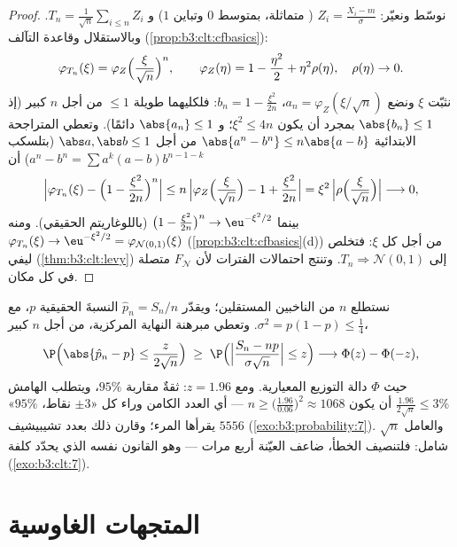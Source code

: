 \begin{proof}
نوسّط ونعيّر: $Z_i = \frac{X_i - m}{\sigma}$ ( متماثلة، بمتوسط $0$ وتباين $1$)
و $T_n =
\frac1{\sqrt n}\sum_{i\leq n}Z_i$. وبالاستقلال وقاعدة التآلف (\cref{prop:b3:clt:cfbasics}):
\[
\varphi_{T_n}(\xi) =
\varphi_{Z}\Bigl(\frac{\xi}{\sqrt n}\Bigr)^{n},
\qquad
\varphi_Z(\eta) = 1 - \frac{\eta^2}2 + \eta^2\rho(\eta),\quad
\rho(\eta)\to0 .
\]
نثبّت $\xi$ ونضع $a_n = \varphi_Z(\xi/\sqrt n)$، $b_n = 1 -
\frac{\xi^2}{2n}$: فلكليهما طويلة $\leq 1$ من
أجل $n$ كبير (إذ $\abs{b_n} \leq 1$ بمجرد أن يكون $\xi^2 \leq 4n$؛ و
$\abs{a_n} \leq 1$ دائمًا). وتعطي المتراجحة الابتدائية $\abs{a^n - b^n} \leq
n\abs{a - b}$ من أجل
$\abs a, \abs b \leq 1$ (بتلسكب $a^n - b^n = \sum a^k(a - b)b^{n-1-k}$) أن
\[
\Bigl|\varphi_{T_n}(\xi) - \Bigl(1 -
\frac{\xi^2}{2n}\Bigr)^{n}\Bigr|
\leq n\,\Bigl|\varphi_Z\Bigl(\frac\xi{\sqrt n}\Bigr) - 1 +
\frac{\xi^2}{2n}\Bigr|
= \xi^2\,\Bigl|\rho\Bigl(\frac{\xi}{\sqrt n}\Bigr)\Bigr|
\longrightarrow 0,
\]
بينما $\bigl(1 - \frac{\xi^2}{2n}\bigr)^n \to
\eu^{-\xi^2/2}$ (باللوغاريتم الحقيقي). ومنه $\varphi_{T_n}(\xi) \to
\eu^{-\xi^2/2} = \varphi_{\mathcal N(0,1)}(\xi)$
(\cref{prop:b3:clt:cfbasics}(d)) من أجل كل $\xi$: فتخلص ليفي (\cref{thm:b3:clt:levy}) إلى
$T_n \Rightarrow \mathcal
N(0,1)$. وتنتج احتمالات الفترات لأن $F_{\mathcal
N}$ متصلة في كل مكان.
\end{proof}

\begin{example}
\label{ex:b3:clt:confidence}
نستطلع $n$ من الناخبين المستقلين؛ ويقدّر $\hat p_n = S_n/n$ النسبةَ
الحقيقية $p$، مع $\sigma^2 = p(1-p) \leq \frac14$. وتعطي مبرهنة النهاية المركزية، من أجل
$n$ كبير،
\[
\P\Bigl(\abs{\hat p_n - p} \leq
\frac{z}{2\sqrt n}\Bigr)
\;\geq\; \P\Bigl(\Bigl|\frac{S_n - np}{\sigma\sqrt n}\Bigr|
\leq z\Bigr)
\longrightarrow \Phi(z) - \Phi(-z),
\]
حيث $\Phi$ دالة التوزيع  المعيارية. ومع $z = 1.96$:
ثقةٌ مقاربة $95\%$، ويتطلب الهامش $\frac{1.96}{2\sqrt n} \leq 3\%$ أن يكون $n \geq
\bigl(\frac{1.96}{0.06}\bigr)^2 \approx 1068$ ---
أي العدد الكامن وراء كل «$\pm3$ نقاط، $95\%$» يقرأها المرء؛
وقارن ذلك بعدد تشيبيشيف $5556$ (\cref{exo:b3:probability:7}). والعامل $\sqrt n$
شامل: فلتنصيف الخطأ، ضاعف العيّنة أربع مرات --- وهو القانون
نفسه الذي يحدّد كلفة  (\cref{exo:b3:clt:7}).
\end{example}

\section{المتجهات الغاوسية}

